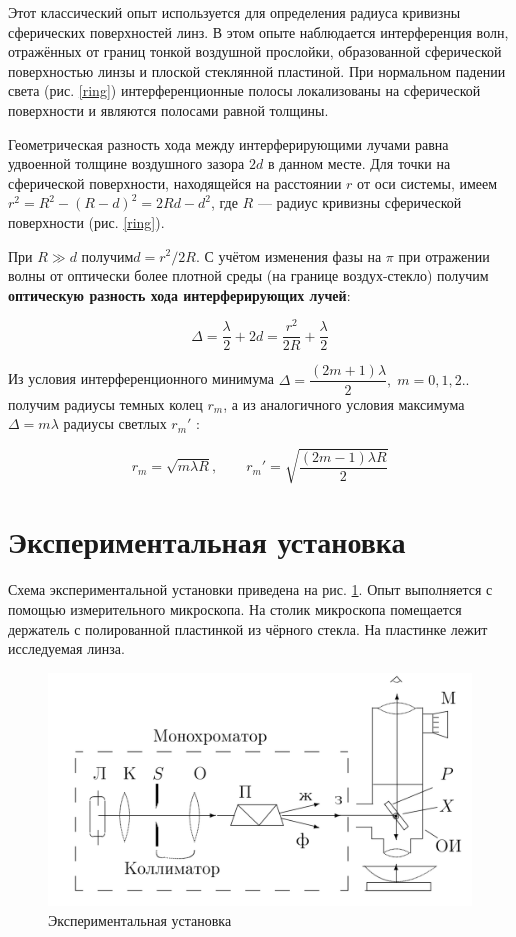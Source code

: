 \documentclass[a4paper,12pt]{article}
\begin{document}
	Этот классический опыт используется для определения радиуса кривизны сферических поверхностей линз. В этом опыте наблюдается интерференция волн, отражённых от границ тонкой воздушной прослойки, образованной сферической поверхностью линзы и плоской стеклянной пластиной. При нормальном падении света (рис. \ref{ring}) интерференционные полосы локализованы на сферической поверхности и являются полосами равной толщины.
	
	Геометрическая разность хода между интерферирующими лучами равна удвоенной толщине воздушного зазора $ 2d $ в данном месте. Для точки на сферической поверхности, находящейся на расстоянии $ r $ от оси системы, имеем $ r^2 = R^2 - (R - d)^2 = 2Rd - d^2 $, где $ R $ --- радиус кривизны сферической поверхности (рис. \ref{ring}).
	
	При $ R \gg d $ получим$  d = r^2/2R $. С учётом изменения фазы на $ \pi $ при отражении волны от оптически более плотной среды (на границе воздух-стекло) получим \textbf{оптическую разность хода интерферирующих лучей}:
	
	\begin{equation}\label{r_m}
	\Delta = \dfrac{\lambda}{2} + 2d = \dfrac{r^2}{2R} + \dfrac{\lambda}{2}
	\end{equation}
	
	Из условия интерференционного минимума $ \Delta = \dfrac{(2m +1)\lambda}{2}, \; m =0, 1, 2.. $ получим радиусы темных колец $ r_m $, а из аналогичного условия максимума $ \Delta = m \lambda $ радиусы светлых $ r_m' $ :
	
	\begin{equation}\label{r_m'}
	r_m = \sqrt{m \lambda R}, \qquad 	r_m' = \sqrt{\dfrac{(2m-1) \lambda R}{2}}
	\end{equation}
	
	\section{Экспериментальная установка}

Схема экспериментальной установки приведена на рис. \ref{lab}. Опыт выполняется с помощью измерительного микроскопа.
На столик микроскопа помещается держатель с полированной пластинкой из
чёрного стекла. На пластинке лежит исследуемая линза.

\newpage

	\begin{figure} 
	\includegraphics[width=\linewidth]{lab}
	\caption{Экспериментальная установка}
	\label{lab}
\end{figure}
\end{document}

